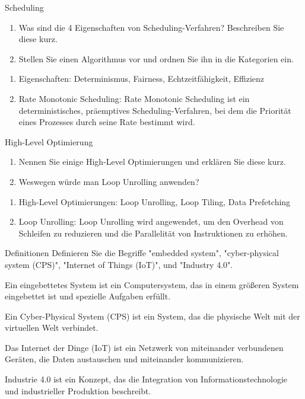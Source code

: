 \documentclass{article}
\begin{document}
\begin{exercise}{Scheduling}
  \begin{enumerate}
    \item Was sind die 4 Eigenschaften von Scheduling-Verfahren? Beschreiben Sie diese kurz.
    \item Stellen Sie einen Algorithmus vor und ordnen Sie ihn in die Kategorien ein.
  \end{enumerate}

  \begin{solution}
    \begin{enumerate}
      \item Eigenschaften: Determinismus, Fairness, Echtzeitfähigkeit, Effizienz
      \item Rate Monotonic Scheduling: Rate Monotonic Scheduling ist ein deterministisches, präemptives Scheduling-Verfahren, bei dem die Priorität eines Prozesses durch seine Rate bestimmt wird.
    \end{enumerate}
  \end{solution}
\end{exercise}

\begin{exercise}{High-Level Optimierung}
  \begin{enumerate}
    \item Nennen Sie einige High-Level Optimierungen und erklären Sie diese kurz.
    \item Weswegen würde man Loop Unrolling anwenden?
  \end{enumerate}

  \begin{solution}
    \begin{enumerate}
      \item High-Level Optimierungen: Loop Unrolling, Loop Tiling, Data Prefetching
      \item Loop Unrolling: Loop Unrolling wird angewendet, um den Overhead von Schleifen zu reduzieren und die Parallelität von Instruktionen zu erhöhen.
    \end{enumerate}
  \end{solution}
\end{exercise}

\begin{exercise}{Definitionen}
  Definieren Sie die Begriffe "embedded system", "cyber-physical system (CPS)", "Internet of Things (IoT)", und "Industry 4.0".

  \begin{solution}
    Ein eingebettetes System ist ein Computersystem, das in einem größeren System eingebettet ist und spezielle Aufgaben erfüllt.

    Ein Cyber-Physical System (CPS) ist ein System, das die physische Welt mit der virtuellen Welt verbindet.

    Das Internet der Dinge (IoT) ist ein Netzwerk von miteinander verbundenen Geräten, die Daten austauschen und miteinander kommunizieren.

    Industrie 4.0 ist ein Konzept, das die Integration von Informationstechnologie und industrieller Produktion beschreibt.
  \end{solution}
\end{exercise}
\end{document}
